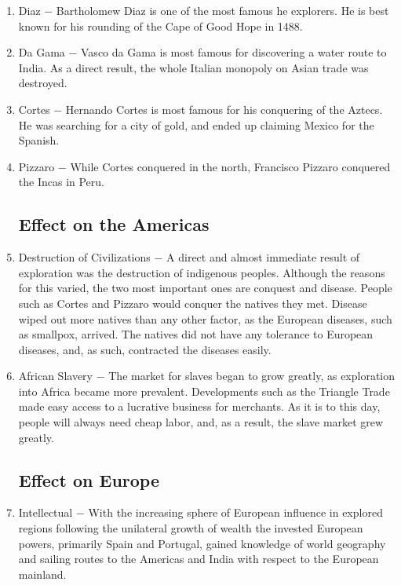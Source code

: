 \documentclass[12pt]{article}
\begin{document}
\begin{enumerate}
\item Diaz $-$ Bartholomew Diaz is one of the most famous he explorers. He is best known for his rounding of the Cape of Good Hope in 1488.

\item Da Gama $-$ Vasco da Gama is most famous for discovering a water route to India. As a direct result, the whole Italian monopoly on Asian trade was destroyed.

\item Cortes $-$ Hernando Cortes is most famous for his conquering of the Aztecs. He was searching for a city of gold, and ended up claiming Mexico for the Spanish.

\item Pizzaro $-$ While Cortes conquered in the north, Francisco Pizzaro conquered the Incas in Peru. 

\subsection{Effect on the Americas}

\item Destruction of Civilizations $-$ A direct and almost immediate result of exploration was the destruction of indigenous peoples. Although the reasons for this varied, the two most important ones are conquest and disease. People such as Cortes and Pizzaro would conquer the natives they met. Disease wiped out more natives than any other factor, as the European diseases, such as smallpox, arrived. The natives did not have any tolerance to European diseases, and, as such, contracted the diseases easily. 

\item African Slavery $-$ The market for slaves began to grow greatly, as exploration into Africa became more prevalent. Developments such as the Triangle Trade made easy access to a lucrative business for merchants. As it is to this day, people will always need cheap labor, and, as a result, the slave market grew greatly.

\subsection{Effect on Europe}

\item Intellectual $-$ With the increasing sphere of European influence in explored regions following the unilateral growth of wealth the invested European powers, primarily Spain and Portugal, gained knowledge of world geography and sailing routes to the Americas and India with respect to the European mainland.


\end{enumerate}
\end{document}

